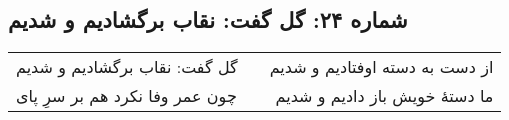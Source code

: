 \begin{center}
\section*{شماره ۲۴: گل گفت: نقاب برگشادیم و شدیم}
\label{sec:024}
\begin{longtable}{l p{0.5cm} r}
گل گفت: نقاب برگشادیم و شدیم
&&
از دست به دسته اوفتادیم و شدیم
\\
چون عمر وفا نکرد هم بر سرِ پای
&&
ما دستهٔ خویش باز دادیم و شدیم
\\
\end{longtable}
\end{center}
